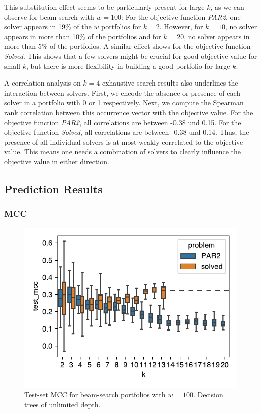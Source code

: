 \documentclass[conference]{IEEEtran}
\begin{document}
This substitution effect seems to be particularly present for large $k$, as we can observe for beam search with $w=100$:
For the objective function \emph{PAR2}, one solver appears in 19\% of the $w$ portfolios for $k=2$.
However, for $k=10$, no solver appears in more than 10\% of the portfolios and for $k=20$, no solver appears in more than 5\% of the portfolios.
A similar effect shows for the objective function \emph{Solved}.
This shows that a few solvers might be crucial for good objective value for small $k$, but there is more flexibility in building a good portfolio for large $k$.

A correlation analysis on $k=4$-exhaustive-search results also underlines the interaction between solvers.
First, we encode the absence or presence of each solver in a portfolio with 0 or 1 respectively.
Next, we compute the Spearman rank correlation between this occurrence vector with the objective value.
For the objective function \emph{PAR2}, all correlations are between -0.38 und 0.15.
For the objective function \emph{Solved}, all correlations are between -0.38 und 0.14.
Thus, the presence of all individual solvers is at most weakly correlated to the objective value.
This means one needs a combination of solvers to clearly influence the objective value in either direction.

\subsection{Prediction Results}

\subsubsection{MCC}

\begin{figure}[htb]
	\centering
	\includegraphics[width=\columnwidth]{plots/mcc.pdf}
	\caption{Test-set MCC for beam-search portfolios with $w=100$. Decision trees of unlimited depth.}
	\label{fig:mcc}
\end{figure}
\end{document}
